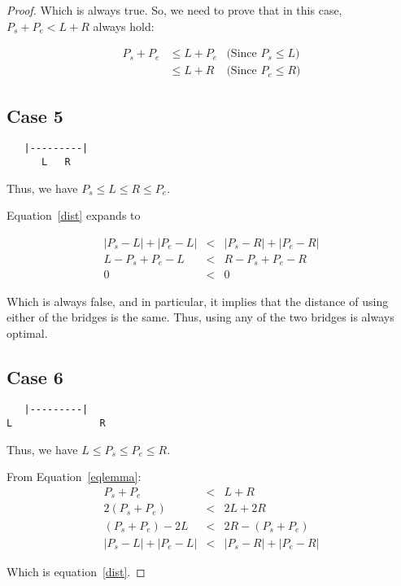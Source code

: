 \documentclass[a4paper]{article}
\begin{document}
\begin{proof}
Which is always true. So, we need to prove that in this case,
$P_s + P_e < L+R$ always hold:

\begin{eqnarray*}
  P_s + P_e &\le L + P_e & \text{(Since $P_s \le L$)} \\
            &\le L + R & \text{(Since $P_e \le R$)}
\end{eqnarray*}

\subsection{Case 5}

\begin{verbatim}
   |---------|
      L   R
\end{verbatim}

Thus, we have $P_s \le L \le R \le P_e$.

Equation~\ref{dist} expands to

\begin{eqnarray*}
  |P_s - L| + |P_e - L| &<& |P_s - R| + |P_e - R| \\
  L - P_s + P_e - L &<& R - P_s + P_e - R \\
  0 &<& 0
\end{eqnarray*}

Which is always false, and in particular, it implies that the distance
of using either of the bridges is the same. Thus, using any of the two
bridges is always optimal.

\subsection{Case 6}

\begin{verbatim}
   |---------|
L               R
\end{verbatim}

Thus, we have $L \le P_s \le P_e \le R$.

From Equation~\ref{eqlemma}:
\begin{eqnarray*}
  P_s + P_e &<& L + R \\
  2(P_s + P_e) &<& 2L + 2R \\
  (P_s + P_e) - 2L &<& 2R - (P_s + P_e) \\
  |P_s - L| + |P_e - L| &<& |P_s - R| + |P_e - R|
\end{eqnarray*}

Which is equation~\ref{dist}.

\end{proof}
\end{document}
